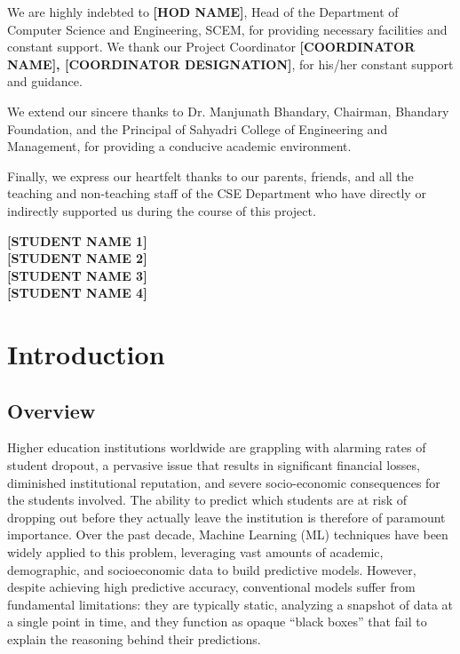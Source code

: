 \documentclass[12pt,a4paper]{report}
\begin{document}
We are highly indebted to \textbf{[HOD NAME]}, Head of the Department of Computer Science and Engineering, SCEM, for providing necessary facilities and constant support. We thank our Project Coordinator \textbf{[COORDINATOR NAME], [COORDINATOR DESIGNATION]}, for his/her constant support and guidance.

We extend our sincere thanks to Dr. Manjunath Bhandary, Chairman, Bhandary Foundation, and the Principal of Sahyadri College of Engineering and Management, for providing a conducive academic environment.

Finally, we express our heartfelt thanks to our parents, friends, and all the teaching and non-teaching staff of the CSE Department who have directly or indirectly supported us during the course of this project.

\vspace{2cm}
\noindent \hfill \textbf{[STUDENT NAME 1]} \\
\hfill \textbf{[STUDENT NAME 2]} \\
\hfill \textbf{[STUDENT NAME 3]} \\
\hfill \textbf{[STUDENT NAME 4]}

\newpage
\tableofcontents
\newpage
\listoffigures
{}
\newpage
\listoftables
{}
\newpage

\pagestyle{fancy}
\fancyhf{}
\renewcommand{\headrulewidth}{0.4pt}
\renewcommand{\footrulewidth}{0.4pt}

\chapter{Introduction}

\section{Overview}
Higher education institutions worldwide are grappling with alarming rates of student dropout, a pervasive issue that results in significant financial losses, diminished institutional reputation, and severe socio-economic consequences for the students involved. The ability to predict which students are at risk of dropping out before they actually leave the institution is therefore of paramount importance. Over the past decade, Machine Learning (ML) techniques have been widely applied to this problem, leveraging vast amounts of academic, demographic, and socioeconomic data to build predictive models. However, despite achieving high predictive accuracy, conventional models suffer from fundamental limitations: they are typically static, analyzing a snapshot of data at a single point in time, and they function as opaque ``black boxes'' that fail to explain the reasoning behind their predictions. 
\end{document}
